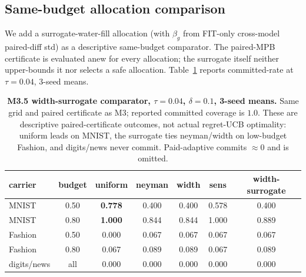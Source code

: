 \documentclass{article}
\begin{document}
\subsection{Same-budget allocation comparison}
We add a surrogate-water-fill allocation (with $\beta_g$ from FIT-only cross-model paired-diff
std) as a descriptive same-budget comparator. The paired-MPB certificate is evaluated anew for
every allocation; the surrogate itself neither upper-bounds it nor selects a safe allocation.
Table~\ref{tab:m35} reports committed-rate at $\tau{=}0.04$, 3-seed means.
\begin{table}[t]
\centering\small\setlength{\tabcolsep}{4pt}
\begin{tabular}{lcccccc}
\toprule
carrier & budget & uniform & neyman & width & sens & width-surrogate \\
\midrule
MNIST & 0.50 & \textbf{0.778} & 0.400 & 0.400 & 0.578 & 0.400 \\
MNIST & 0.80 & \textbf{1.000} & 0.844 & 0.844 & 1.000 & 0.889 \\
Fashion & 0.50 & 0.000 & 0.067 & 0.067 & 0.067 & 0.067 \\
Fashion & 0.80 & 0.067 & 0.089 & 0.089 & 0.067 & 0.089 \\
digits/news & all & 0.000 & 0.000 & 0.000 & 0.000 & 0.000 \\
\bottomrule
\end{tabular}
\caption{\textbf{M3.5 width-surrogate comparator, $\tau{=}0.04$, $\delta{=}0.1$, 3-seed means.}
Same grid and paired certificate as M3; reported committed coverage is $1.0$. These are
descriptive paired-certificate outcomes, not actual regret-UCB optimality: uniform leads on
MNIST, the surrogate ties neyman/width on low-budget Fashion, and digits/news never commit.
Paid-adaptive commits $\approx0$ and is omitted.}
\label{tab:m35}
\end{table}
\end{document}
